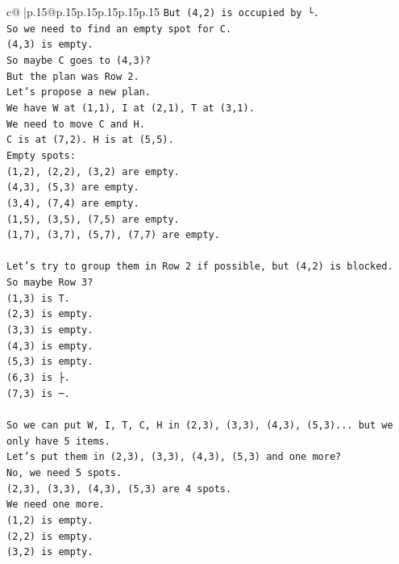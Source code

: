 \documentclass{article}
\begin{document}
{\begin{supertabular}{c@{$\;$}|p{.15\linewidth}@{}p{.15\linewidth}p{.15\linewidth}p{.15\linewidth}p{.15\linewidth}p{.15\linewidth}}
{{{\texttt{But (4,2) is occupied by └.} \\
\texttt{So we need to find an empty spot for C.} \\
\texttt{(4,3) is empty.} \\
\texttt{So maybe C goes to (4,3)?} \\
\texttt{But the plan was Row 2.} \\
\texttt{Let's propose a new plan.} \\
\texttt{We have W at (1,1), I at (2,1), T at (3,1).} \\
\texttt{We need to move C and H.} \\
\texttt{C is at (7,2). H is at (5,5).} \\
\texttt{Empty spots:} \\
\texttt{(1,2), (2,2), (3,2) are empty.} \\
\texttt{(4,3), (5,3) are empty.} \\
\texttt{(3,4), (7,4) are empty.} \\
\texttt{(1,5), (3,5), (7,5) are empty.} \\
\texttt{(1,7), (3,7), (5,7), (7,7) are empty.} \\
\\ 
\texttt{Let's try to group them in Row 2 if possible, but (4,2) is blocked.} \\
\texttt{So maybe Row 3?} \\
\texttt{(1,3) is T.} \\
\texttt{(2,3) is empty.} \\
\texttt{(3,3) is empty.} \\
\texttt{(4,3) is empty.} \\
\texttt{(5,3) is empty.} \\
\texttt{(6,3) is ├.} \\
\texttt{(7,3) is ─.} \\
\\ 
\texttt{So we can put W, I, T, C, H in (2,3), (3,3), (4,3), (5,3)... but we only have 5 items.} \\
\texttt{Let's put them in (2,3), (3,3), (4,3), (5,3) and one more?} \\
\texttt{No, we need 5 spots.} \\
\texttt{(2,3), (3,3), (4,3), (5,3) are 4 spots.} \\
\texttt{We need one more.} \\
\texttt{(1,2) is empty.} \\
\texttt{(2,2) is empty.} \\
\texttt{(3,2) is empty.} \\
}}}
\end{supertabular}}
\end{document}
